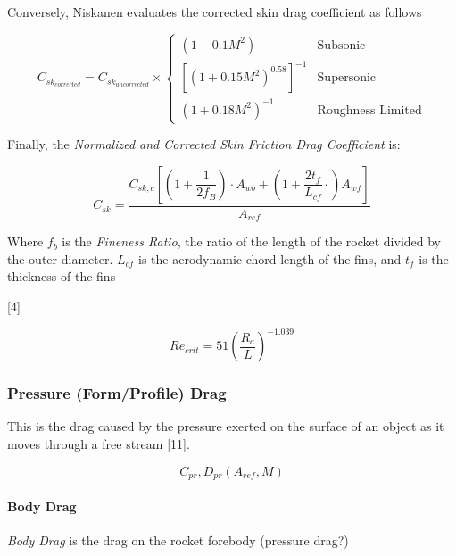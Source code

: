 \documentclass[]{article}
\let\oldparagraph\paragraph
\renewcommand{\paragraph}[1]{\oldparagraph{#1}\mbox{}}
\begin{document}
Conversely, Niskanen evaluates the corrected skin drag coefficient as
follows

\begin{equation}
\label{eq_skin_drag_coefficient_corrected}
C_{sk_{corrected}} = C_{sk_{uncorrected}} \times 
\begin{cases}
     ( 1- 0.1 M^2 )                          & \text{Subsonic} \\
     \left[ (1+0.15 M^2)^{0.58} \right]^{-1} & \text{Supersonic} \\
     ( 1 + 0.18 M^2 )^{-1}                   & \text{Roughness Limited}
\end{cases}
\end{equation}

Finally, the \emph{Normalized and Corrected Skin Friction Drag
Coefficient} is:

\begin{equation}
C_{sk} = \dfrac{ C_{sk,c} \left[ \left( 1+ \dfrac{1}{2 f_B} \right) \cdot A_{wb} + \left( 1 + \dfrac{2t_f}{L_{cf}}\cdot \right) A_{wf} \right] }{A_{ref}}
\end{equation}

Where \(f_b\) is the \emph{Fineness Ratio}, the ratio of the length of
the rocket divided by the outer diameter. \(L_{cf}\) is the aerodynamic
chord length of the fins, and \(t_f\) is the thickness of the fins

{[}4{]}

\begin{equation}
\label{eq_reynolds_critical}
Re_{crit} = 51 \left( \dfrac{R_a}{L} \right) ^{-1.039} 
\end{equation}

\subsubsection{Pressure (Form/Profile)
Drag}\label{pressure-formprofile-drag}

This is the drag caused by the pressure exerted on the surface of an
object as it moves through a free stream {[}11{]}.

\begin{equation} 
C_{pr}, D_{pr} (A_{ref}, M) 
\end{equation}

\paragraph{Body Drag}\label{body-drag}

\emph{Body Drag} is the drag on the rocket forebody (pressure drag?)
\end{document}
